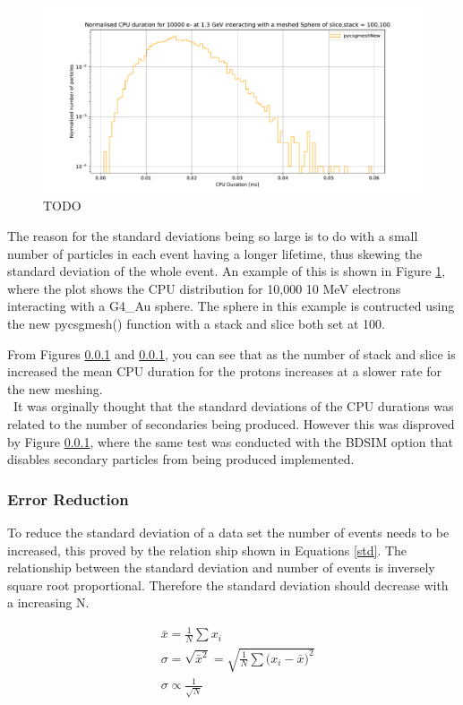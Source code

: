 \documentclass[12pt,a4paper]{article}
\begin{document}
\begin{figure}[h!]
\centering
\includegraphics[scale=0.5]{Images//CPU//pythonhist1.pdf}
\caption[width=\columnwidth]{TODO}
\label{disty}
\end{figure}

\noindent The reason for the standard deviations being so large is to do with a small number of particles in each event having a longer lifetime, thus skewing the standard deviation of the whole event. An example of this is shown in Figure \ref{disty}, where the plot shows the CPU distribution for 10,000 10 MeV electrons interacting with a G4\_Au sphere. The sphere in this example is contructed using the new pycsgmesh() function with a stack and slice both set at 100.

\noindent From Figures \ref{} and \ref{}, you can see that as the number of stack and slice is increased the mean CPU duration for the protons increases at a slower rate for the new meshing. 
\\\
\noindent It was orginally thought that the standard deviations of the CPU durations was related to the number of secondaries being produced. However this was disproved by Figure \ref{}, where the same test was conducted with the BDSIM option that disables secondary particles from being produced implemented.

\subsubsection{Error Reduction}
To reduce the standard deviation of a data set the number of events needs to be increased, this proved by the relation ship shown in Equations \ref{std}. The relationship between the standard deviation and number of events is inversely square root proportional. Therefore the standard deviation should decrease with a increasing N.

\begin{equation}
\begin{aligned}
& \bar{x} = \frac{1}{N}\sum{x_i}\\
& \sigma = \sqrt{\bar{x}^2} = \sqrt{\frac{1}{N}\sum{(x_i - \bar{x}})^2}\\
& \sigma \propto \frac{1}{\sqrt{N}} 
\end{aligned}
\label{std}
\end{equation}
\end{document}
